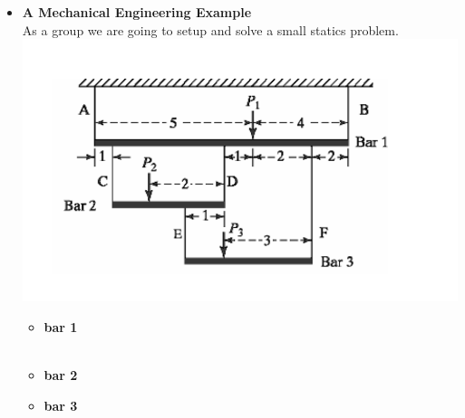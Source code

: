 \documentclass[11pt]{article}
\begin{document}
\begin{itemize}
%		 
%	
%
%		
%
\item \textbf{\LARGE A Mechanical Engineering Example}\\	
		
		As a group we are going to setup and solve a small statics problem. \\
		\includegraphics[scale=.75]{lecture1_fig1.png}\\
		{\Large
		\begin{itemize}
		 \item \textbf{bar 1} 	\\\\
		 \newpage
		  \item \textbf{bar 2}	\\ \vspace{80 mm}
		   \item \textbf{bar 3} 	\\\\
		\end{itemize} }
\newpage


\end{itemize}
\end{document}
